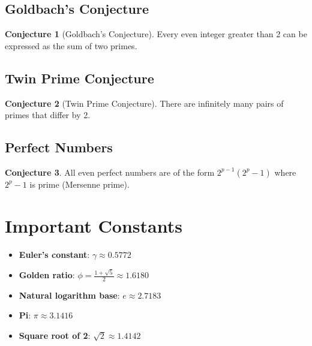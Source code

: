 \documentclass[11pt]{article}
\theoremstyle{definition}
\newtheorem{conjecture}{Conjecture}[section]
\begin{document}
\subsection{Goldbach's Conjecture}
\begin{conjecture}[Goldbach's Conjecture]
Every even integer greater than 2 can be expressed as the sum of two primes.
\end{conjecture}

\subsection{Twin Prime Conjecture}
\begin{conjecture}[Twin Prime Conjecture]
There are infinitely many pairs of primes that differ by 2.
\end{conjecture}

\subsection{Perfect Numbers}
\begin{conjecture}
All even perfect numbers are of the form $2^{p-1}(2^p - 1)$ where $2^p - 1$ is prime (Mersenne prime).
\end{conjecture}

\section{Important Constants}

\begin{itemize}
    \item \textbf{Euler's constant}: $\gamma \approx 0.5772$
    \item \textbf{Golden ratio}: $\phi = \frac{1+\sqrt{5}}{2} \approx 1.6180$
    \item \textbf{Natural logarithm base}: $e \approx 2.7183$
    \item \textbf{Pi}: $\pi \approx 3.1416$
    \item \textbf{Square root of 2}: $\sqrt{2} \approx 1.4142$
\end{itemize}
\end{document}
